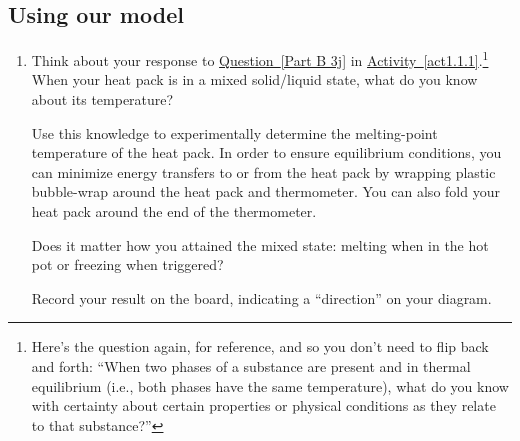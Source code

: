 
\subsection{Using our model}
\label{act1.1.2B.3}

\begin{enumerate}
	\item Think about your response to \hyperref[Part B 3j]{Question~\ref*{Part B 3j}} in \hyperref[act1.1.1]{Activity~\ref*{act1.1.1}}.\footnote{Here's the question again, for reference, and so you don't need to flip back and forth: ``When two phases of a substance are present and in thermal equilibrium (i.e., both phases have the same temperature), what do you know with certainty about certain properties or physical conditions as they relate to that substance?''} When your heat pack is in a mixed solid/liquid state, what do you know about its temperature?
	
		Use this knowledge to experimentally determine the melting-point temperature of the heat pack. In order to ensure equilibrium conditions, you can minimize energy transfers to or from the heat pack by wrapping plastic bubble-wrap around the heat pack and thermometer. You can also fold your heat pack around the end of the thermometer.
		
		Does it matter how you attained the mixed state: melting when in the hot pot or freezing when triggered?
		
		Record your result on the board, indicating a ``direction'' on your diagram.
	
	

\end{enumerate}
